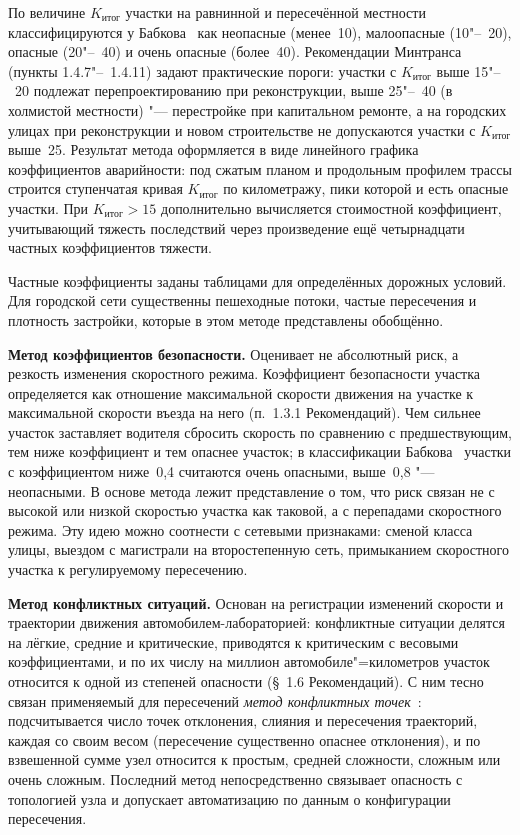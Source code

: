 \documentclass[coursework]{SCWorks}
\begin{document}
По величине $K_{\text{итог}}$ участки на равнинной и пересечённой
местности классифицируются у Бабкова~\cite{babkov1993} как неопасные
(менее~10), малоопасные (10"--~20), опасные (20"--~40) и очень опасные
(более~40). Рекомендации Минтранса (пункты 1.4.7"--~1.4.11)
задают
практические пороги: участки с $K_{\text{итог}}$ выше 15"--~20 подлежат
перепроектированию при реконструкции, выше 25"--~40 (в холмистой
местности) "--- перестройке при капитальном ремонте, а на городских
улицах при реконструкции и новом строительстве не допускаются участки с
$K_{\text{итог}}$ выше~25.
Результат метода оформляется в виде линейного графика коэффициентов
аварийности: под сжатым планом и продольным профилем трассы строится
ступенчатая кривая $K_{\text{итог}}$ по километражу, пики которой и
есть опасные участки. При $K_{\text{итог}} > 15$ дополнительно
вычисляется стоимостной коэффициент, учитывающий тяжесть последствий
через произведение ещё четырнадцати частных коэффициентов тяжести.

Частные коэффициенты заданы таблицами для определённых дорожных
условий. Для городской сети существенны пешеходные потоки,
частые пересечения и плотность застройки, которые в этом методе
представлены обобщённо.

\textbf{Метод коэффициентов безопасности.} Оценивает не абсолютный
риск, а резкость изменения скоростного режима. Коэффициент безопасности
участка определяется как отношение максимальной скорости движения на
участке к максимальной скорости въезда на него (п.~1.3.1 Рекомендаций).
Чем сильнее участок заставляет водителя сбросить скорость по сравнению
с предшествующим, тем ниже коэффициент и тем опаснее участок; в
классификации Бабкова~\cite{babkov1993} участки с коэффициентом
ниже~0{,}4 считаются очень опасными, выше~0{,}8 "---
неопасными. В основе метода лежит представление о том, что риск связан
не с высокой или низкой скоростью участка как таковой, а с перепадами
скоростного режима. Эту идею можно соотнести с сетевыми признаками:
сменой класса улицы, выездом с магистрали на второстепенную сеть,
примыканием скоростного участка к регулируемому пересечению.

\textbf{Метод конфликтных ситуаций.} Основан на регистрации
изменений скорости и траектории движения автомобилем-лабораторией:
конфликтные ситуации делятся на лёгкие, средние и критические,
приводятся к критическим с весовыми коэффициентами, и по их числу на
миллион автомобиле"=километров участок относится к одной из степеней
опасности (§~1.6 Рекомендаций). С ним тесно связан применяемый для
пересечений \emph{метод конфликтных точек}~\cite{babkov1993}:
подсчитывается число точек отклонения, слияния и пересечения траекторий,
каждая со своим весом (пересечение существенно опаснее отклонения), и по
взвешенной сумме узел относится к простым, средней сложности, сложным
или очень сложным. Последний метод непосредственно связывает опасность с
топологией узла и допускает автоматизацию по данным о конфигурации
пересечения.
\end{document}
